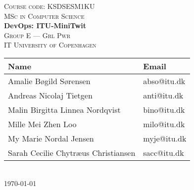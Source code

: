 \newcommand{\HRule}{\rule{1.25\linewidth}{0.5mm}}
\center
\vspace*{-4.35cm}
%
\vspace{3cm}
\textsc{\large Course code: KSDSESM1KU}
\\[0.2cm]
\textsc{\large MSc in Computer Science}
\\[0.5cm]
\hbox{\makebox[1\textwidth][c]{\HRule}}
\vspace{0.4cm}
{ \huge \bfseries DevOps: ITU-MiniTwit}
\\[0.6cm]
\hbox{\makebox[1\textwidth][c]{\HRule}}
\vspace{0.9cm}
\textsc{\Large Group E --- Grl Pwr\\[0.5cm]IT University of Copenhagen}\\[1.5cm]
\begin{tabular}{ll}
\toprule
\textbf{Name} & \textbf{Email} \\
\midrule
Amalie Bøgild Sørensen & abso@itu.dk \\
Andreas Nicolaj Tietgen & anti@itu.dk \\
Malin Birgitta Linnea Nordqvist & bino@itu.dk \\
Mille Mei Zhen Loo & milo@itu.dk \\
My Marie Nordal Jensen & myje@itu.dk \\
Sarah Cecilie Chytræus Christiansen & sacc@itu.dk \\

\bottomrule
\end{tabular}
\\[2cm]
{\large \today}
\vfill
